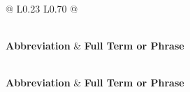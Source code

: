 \documentclass{article}
\begin{document}
\begin{longtable}{@{} L{0.23\textwidth} L{0.70\textwidth} @{}} %
\caption{Common abbreviations used throughout this document} \\

\toprule
\textbf{Abbreviation} & \textbf{Full Term or Phrase} \\
\midrule
\endfirsthead

 \\
\toprule
\textbf{Abbreviation} & \textbf{Full Term or Phrase} \\
\midrule
\endhead

\midrule
{} \\
\endfoot

\bottomrule
\endlastfoot


\end{longtable}
\end{document}
